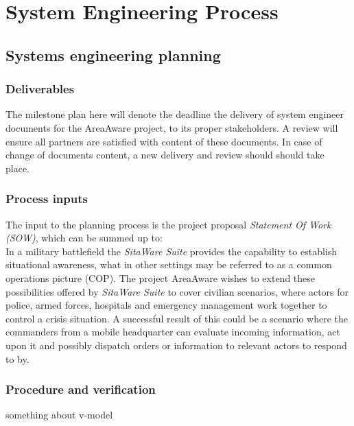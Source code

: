 %
\thispagestyle{fancy}
\chapter{System Engineering Process}
\label{chp:se_process}

\section{Systems engineering planning}

\subsection{Deliverables}
\label{plan:deliverables}
The milestone plan here will denote the deadline the delivery of system engineer documents for the AreaAware project, to its proper stakeholders.
A review will ensure all partners are satisfied with content of these documents.
In case of change of documents content, a new delivery and review should should take place.

\subsection{Process inputs}
The input to the planning process is the project proposal \emph{Statement Of Work (SOW)}, which can be summed up to: \\
In a military battlefield the \emph{SitaWare Suite} provides the capability to establish situational awareness, what in other settings may be referred to as a common operations picture (COP).
The project AreaAware wishes to extend these possibilities offered by \emph{SitaWare Suite} to cover civilian scenarios, where actors for police, armed forces, hospitals and emergency management work together to control a crisis situation.
A successful result of this could be a scenario where the commanders from a mobile headquarter can evaluate incoming information, act upon it and possibly dispatch orders or information to relevant actors to respond to by.

\subsection{Procedure and verification}
something about v-model

